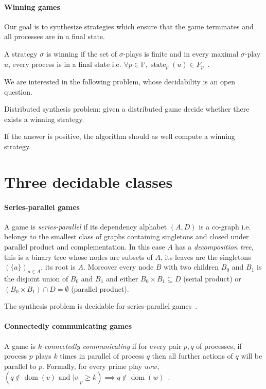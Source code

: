 \documentclass[a4paper,UKenglish]{lipics-v2016}
\newcommand{\PP}{\mathbb{P}}
\DeclareMathOperator{\dom}{dom}
\DeclareMathOperator{\state}{state}
\begin{document}
 \paragraph*{Winning games}
 
Our goal is to synthesize  strategies
which ensure that the game terminates and 
all processes are in a final state.

\begin{definition}
A strategy $\sigma$ is winning if
the set of $\sigma$-plays  is finite
and in every maximal $\sigma$-play $u$,
every process is in a final state
i.e. $
\forall p \in \PP, \state_p(u)\in  F_p\enspace.
$
\end{definition}
We are interested in the following problem, whose decidability is an open question.
\smallskip

{\noindent \sc Distributed synthesis problem:}
given a distributed game decide
whether  there exists a winning strategy.

\smallskip

If the answer is positive,
the algorithm should as well compute a
winning strategy.




\section{Three decidable classes}
\label{sec:examples}

\paragraph*{Series-parallel games}
A game is \emph{series-parallel} if its dependency alphabet $(A,D)$
is a co-graph i.e. belongs to the smallest class of graphs containing singletons and closed under parallel product and complementation. In this case $A$ has a \emph{decomposition tree},
this is a binary tree whose nodes are subsets of $A$,
its leaves are the singletons $(\{a\})_{a\in A}$,
its root is $A$.
Moreover
every node $B$ with two children $B_0$ and $B_1$
 is the disjoint union of $B_0$ and $B_1$
 and either 
 $B_0\times B_1 \subseteq D$
(serial product)
 or $(B_0\times B_1) \cap D = \emptyset$  (parallel product).

The synthesis problem is decidable for series-parallel games~\cite{gastin}.


 
\paragraph*{Connectedly communicating games}
A game is \emph{$k$-connectedly communicating}  if
for every pair $p,q$ of processes,
 if process $p$ plays $k$ times in parallel of process $q$
 then all further actions of $q$ will be parallel to $p$.
 Formally, for every prime play $uvw$,
$
\label{eq:ccpdef}
(q \not \in\dom(v) \text{ and } |v|_p\geq k )
\implies 
q \not \in \dom(w)\enspace.
$
\end{document}
